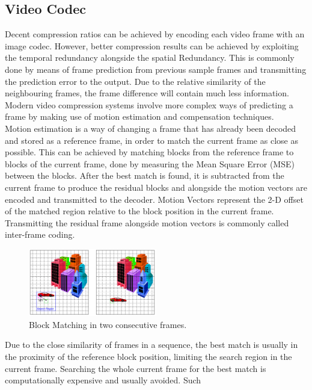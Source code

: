 \documentclass[a4paper,11pt,oneside]{article}
\begin{document}
\subsection{Video Codec}
\indent Decent compression ratios can be achieved by encoding each video frame with an image codec. However, better compression results can be
achieved by exploiting the temporal redundancy alongside the spatial Redundancy. This is commonly done by means of frame prediction from
previous sample frames and transmitting the prediction error to the output. Due to the relative similarity of the neighbouring frames, the
frame difference will contain much less information. Modern video compression systems involve more complex ways of predicting a frame by making
use of motion estimation and compensation techniques. \\
\indent Motion estimation is a way of changing a frame that has already been decoded and stored as a reference frame, in order to match the current frame as close as possible. This can be achieved by matching blocks from the reference frame to blocks of the current frame, done by measuring the Mean Square Error (MSE) between the blocks. After the best match is found, it is subtracted from the current frame to produce the residual blocks and alongside the motion vectors are encoded and transmitted to the decoder. Motion Vectors represent the 2-D offset of the matched region relative to the block position in the current frame. Transmitting the residual frame alongside motion vectors is commonly called inter-frame coding. \\
\begin{figure}[h]
    \centering  
    \includegraphics[width=0.5\textwidth]{../figures/motion_vectors.pdf}
    \caption{Block Matching in two consecutive frames. \cite[week 14]{wang_video_slides}}
    \label{figure:block_matching}
\end{figure}
Due to the close similarity of frames in a sequence, the best match is usually in the proximity of the reference block position, limiting the
search region in the current frame. Searching the whole current frame for the best match is computationally expensive and usually avoided. Such
\end{document}
